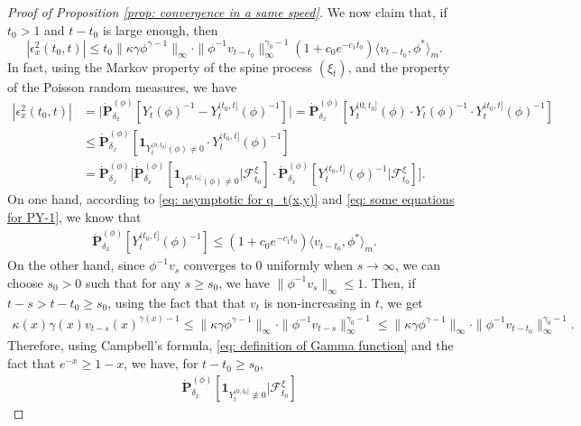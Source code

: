 \documentclass[12pt, a4paper]{amsart}
\theoremstyle{definition}
\numberwithin{equation}{section}
\begin{document}
\begin{proof}[Proof of Proposition \ref{prop: convergence in a same speed}]
	We now claim that, if $t_0 > 1$ and $t-t_0$ is large enough, then
\[\label{eq:upperbound_of_epsilon-2}
	|\epsilon_x^2(t_0,t)|
	\leq t_0\|\kappa\gamma\phi^{\gamma - 1}\|_{\infty} \cdot \|\phi^{-1}v_{t-t_0}\|^{\gamma_0-1}_\infty (1+c_0 e^{-c_1 t_0}) \langle v_{t-t_0},\phi^* \rangle_m.
\]
	In fact, using the Markov property of the spine process $(\xi_t)$, and the property of the Poisson random measures, we have
\[\label{eq:epsilon-2}\begin{split}
	|\epsilon_x^2(t_0,t)|
	&= \big| \dot{\mathbf P}_{\delta_x}^{(\phi)}[Y_t(\phi)^{-1} - Y^{(t_0,t]}_t(\phi)^{-1}] \big|
	= \dot{\mathbf P}_{\delta_x}^{(\phi)}[Y_t^{(0,t_0]}(\phi)\cdot Y_t(\phi)^{-1}\cdot Y^{(t_0,t]}_t(\phi)^{-1}]
	\\&\leq \dot{\mathbf P}_{\delta_x}^{(\phi)}[\mathbf 1_{Y_t^{(0,t_0]}(\phi)\neq 0}\cdot Y^{(t_0,t]}_t(\phi)^{-1}]
	\\&= \dot{\mathbf P}_{\delta_x}^{(\phi)} \big[\dot{\mathbf P}_{\delta_x}^{(\phi)}[\mathbf 1_{Y_t^{(0,t_0]}(\phi)\neq 0}|\mathscr F^\xi_{t_0}] \cdot \dot{\mathbf P}_{\delta_x}^{(\phi)} [ Y^{(t_0,t]}_t(\phi)^{-1}|\mathscr F^\xi_{t_0}] \big].
\end{split}\]
	On one hand, according to \eqref{eq: asymptotic for q_t(x,y)} and \eqref{eq: some equations for PY-1}, we know that
\[\label{eq:epsilon-2-final}\begin{split}
	\dot{\mathbf P}_{\delta_x}^{(\phi)}[ Y^{(t_0,t]}_t(\phi)^{-1}]
	\leq (1+c_0 e^{-c_1 t_0}) \langle v_{t-t_0},\phi^* \rangle_m.
\end{split}\]
	On the other hand, since $\phi^{-1}v_s$ converges to $0$ uniformly when $s\to \infty$, we can choose  $s_0>0$ such that for any $s\geq s_0$, we have $\|\phi^{-1}v_s\|_{\infty} \leq 1$.
	Then, if $t-s > t-t_0 \geq s_0$, using the fact that  that $v_t$ is non-increasing in $t$, we get
\[\begin{split}
	\kappa(x)\gamma(x) v_{t-s}(x)^{\gamma(x)-1}
	\leq \|\kappa \gamma \phi^{\gamma - 1}\|_\infty \cdot \|\phi^{-1} v_{t-s}\|^{\gamma_0-1}_\infty
	\leq \|\kappa\gamma\phi^{\gamma - 1}\|_\infty \cdot \|\phi^{-1}v_{t-t_0}\|^{\gamma_0-1}_\infty.
\end{split}\]
Therefore, using Campbell's formula, \eqref{eq: definition of Gamma function} and the fact that $e^{-x} \geq 1-x$, we have,  for $t-t_0 \geq s_0$,
\[\begin{split}
	&\dot{\mathbf P}_{\delta_x}^{(\phi)}[\mathbf 1_{Y_t^{(0,t_0]}\not \equiv  0}|\mathscr F^\xi_{t_0}]

\end{split}\]
\end{proof}
\end{document}
